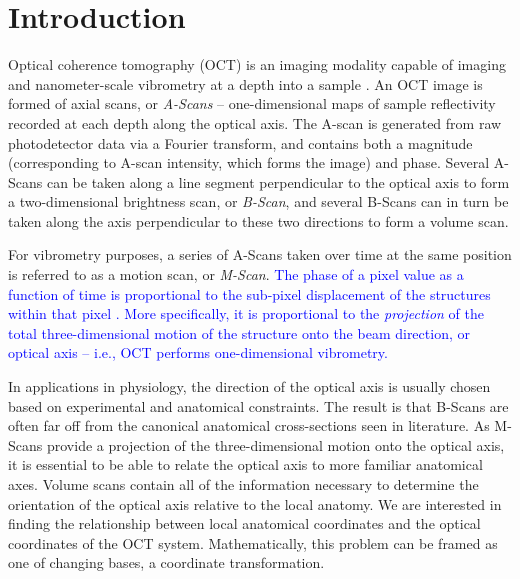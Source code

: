 \documentclass[preprint,NumberedRefs]{JASA}
\begin{document}
\section{Introduction}
\par{Optical coherence tomography (OCT) is an imaging modality capable of imaging and nanometer-scale vibrometry at a depth into a sample \citep{OCTtheory,sdpm}. An OCT image is formed of axial scans, or \textit{A-Scans} -- one-dimensional maps of sample reflectivity recorded at each depth along the optical axis. The A-scan is generated from raw photodetector data via a Fourier transform, and contains both a magnitude (corresponding to A-scan intensity, which forms the image) and phase.  Several A-Scans can be taken along a line segment perpendicular to the optical axis to form a two-dimensional brightness scan, or \textit{B-Scan}, and several B-Scans can in turn be taken along the axis perpendicular to these two directions to form a volume scan.}
\par{For vibrometry purposes, a series of A-Scans taken over time at the same position is referred to as a motion scan, or \textit{M-Scan}. \textcolor{blue}{The phase of a pixel value as a function of time is proportional to the sub-pixel displacement of the structures within that pixel \citep{sdpm}. More specifically, it is proportional to the \textit{projection} of the total three-dimensional motion of the structure onto the beam direction, or optical axis -- i.e., OCT performs one-dimensional vibrometry.}}
\par{In applications in physiology, the direction of the optical axis is usually chosen based on experimental and anatomical constraints. The result is that B-Scans are often far off from the canonical anatomical cross-sections seen in literature. As M-Scans provide a projection of the three-dimensional motion onto the optical axis, it is essential to be able to relate the optical axis to more familiar anatomical axes. Volume scans contain all of the information necessary to determine the orientation of the optical axis relative to the local anatomy. We are interested in finding the relationship between local anatomical coordinates and the optical coordinates of the OCT system. Mathematically, this problem can be framed as one of changing bases, a coordinate transformation.} 
\end{document}
